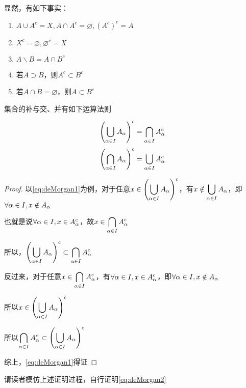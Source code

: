 显然，有如下事实：

\begin{enumerate}
    \item $A\cup A^c = X, A\cap A^c = \varnothing, (A^c)^c = A$
    \item $X^c = \varnothing,\varnothing^c = X$
    \item $A\backslash B = A\cap B^c$
    \item 若$A\supset B$，则$A^c\subset B^c$
    \item 若$A\cap B = \varnothing$，则$A\subset B^c$
\end{enumerate}

集合的补与交、并有如下运算法则

\begin{theorem}[De.Morgan法则]
    \begin{equation}
        \label{eq:deMorgan1}
        \left(\bigcup_{\alpha \in I} A_\alpha\right)^c = \bigcap_{\alpha \in I} A_\alpha^c
    \end{equation}
    \begin{equation}
        \label{eq:deMorgan2}
        \left(\bigcap_{\alpha \in I} A_\alpha\right)^c = \bigcup_{\alpha \in I} A_\alpha^c
    \end{equation}
\end{theorem}

\begin{proof}
    以\eqref{eq:deMorgan1}为例，对于任意$\displaystyle x\in \left(\bigcup_{\alpha \in I} A_\alpha\right)^c$，有$\displaystyle x\notin \bigcup_{\alpha \in I}A_\alpha$，即$\forall \alpha \in I,x\notin A_\alpha$

    也就是说$\forall \alpha \in I,x\in A^c_\alpha$，故$\displaystyle x\in \bigcap_{\alpha \in I}A_\alpha^c$

    所以，$\displaystyle \left(\bigcup_{\alpha \in I} A_\alpha\right)^c \subset \bigcap_{\alpha \in I} A_\alpha^c$

    反过来，对于任意$\displaystyle x\in \bigcap_{\alpha \in I}A_\alpha^c$，有$\forall \alpha \in I,x\in A^c_\alpha$，即$\forall \alpha \in I,x\notin A_\alpha$

    所以$\displaystyle x\in \left(\bigcup_{\alpha \in I} A_\alpha\right)^c$

    所以$\displaystyle \bigcap_{\alpha \in I} A_\alpha^c \subset \left(\bigcup_{\alpha \in I} A_\alpha\right)^c$

    综上，\eqref{eq:deMorgan1}得证
\end{proof}

请读者模仿上述证明过程，自行证明\eqref{eq:deMorgan2}

